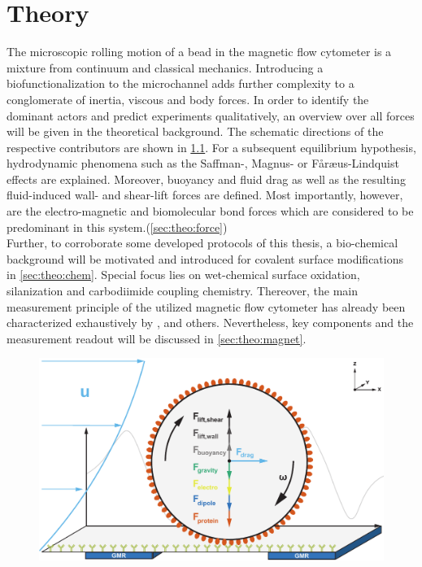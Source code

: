 \setcounter{page}{1}
\chapter{Theory}
The microscopic rolling motion of a bead in the magnetic flow cytometer is a mixture from continuum and classical mechanics. Introducing a biofunctionalization to the microchannel adds further complexity to a conglomerate of inertia, viscous and body forces. In order to identify the dominant actors and predict experiments qualitatively, an overview over all forces will be given in the theoretical background. The schematic directions of the respective contributors are shown in \cref{fig:theo:figOne}. For a subsequent equilibrium hypothesis, hydrodynamic phenomena such as the Saffman-, Magnus- or F\aa{}r\ae{}us-Lindquist effects are explained. Moreover, buoyancy and fluid drag as well as the resulting fluid-induced wall- and shear-lift forces are defined. Most importantly, however, are the electro-magnetic and biomolecular bond forces which are considered to be predominant in this system.(\cref{sec:theo:force})\\
Further, to corroborate some developed protocols of this thesis, a bio-chemical background will be motivated and introduced for covalent surface modifications in \cref{sec:theo:chem}. Special focus lies on wet-chemical surface oxidation, silanization and carbodiimide coupling chemistry. Thereover, the main measurement principle of the utilized magnetic flow cytometer has already been characterized exhaustively by \citet{lit:thes:helou}, \citet{lit:thes:reisbeck} and others.\cite{lit:thes:esthi,lit:thes:brenner} Nevertheless, key components and the measurement readout will be discussed in \cref{sec:theo:magnet}.
\begin{figure}[!htb]
	\centering
	\includegraphics[width=.75\linewidth]{Ressources/Fluidic/FigureOne}
	\label{fig:theo:figOne}
\end{figure}

